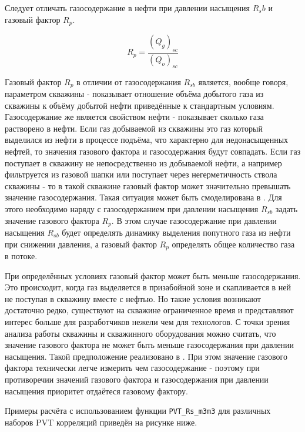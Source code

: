 \documentclass[]{scrreprt}
\begin{document}
Следует отличать газосодержание в нефти при давлении насыщения $R_sb$ и газовый фактор $R_p$.

$$R_p = \frac{(Q_g)_{sc}}{(Q_o)_{sc}}$$

Газовый фактор $R_{p}$  в отличии от газосодержания $R_{sb}$  является, вообще говоря, параметром скважины - показывает отношение объёма добытого газа из скважины к объёму добытой нефти приведённые к стандартным условиям. Газосодержание же является свойством нефти - показывает сколько газа растворено в нефти. Если газ добываемой из скважины это газ который выделился из нефти в процессе подъёма, что характерно для недонасыщенных нефтей, то значения газового фактора и газосодержания будут совпадать. Если газ поступает в скважину не непосредственно из добываемой нефти, а например фильтруется из газовой шапки или поступает через негерметичность ствола скважины - то в такой скважине газовый фактор может значительно превышать значение газосодержания. Такая ситуация может быть смоделирована в \unf. Для этого необходимо наряду с газосодержанием при давлении насыщения $R_{sb}$ задать значение газового фактора $R_p$. В этом случае газосодержание при давлении насыщения $R_{sb}$  будет определять динамику выделения попутного газа из нефти при снижении давления, а газовый фактор $R_p$ определять общее количество газа в потоке. 

При определённых условиях газовый фактор может быть меньше газосодержания. Это происходит, когда газ выделяется в призабойной зоне и скапливается в ней не поступая в скважину вместе с нефтью. Но такие условия возникают достаточно редко, существуют на скважине ограниченное время и представляют интерес больше для разработчиков нежели чем для технологов. С точки зрения анализа работы скважины и скважинного оборудования можно считать, что значение газового фактора не может быть меньше газосодержания при давлении насыщения. Такой предположение реализовано в \unf. При этом значение газового фактора технически легче измерить чем газосодержание - поэтому при противоречии значений газового фактора и газосодержания при давлении насыщения приоритет отдаётеся газовому фактору. 



Примеры расчёта с использованием функции \texttt{PVT_Rs_m3m3} для различных наборов PVT корреляций приведён на рисунке ниже.
\end{document}
